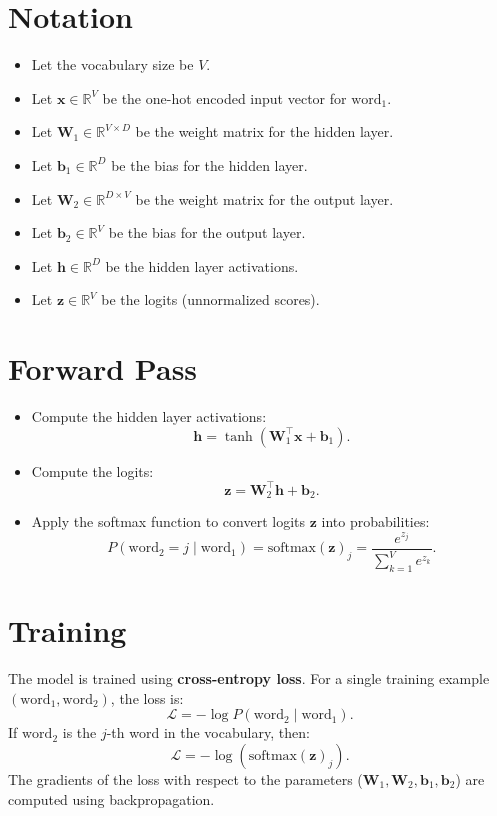 \begin{notechapter}
\section{Notation}
\begin{itemize}
    \item Let the vocabulary size be \( V \).
    \item Let \(\mathbf{x} \in \mathbb{R}^V\) be the one-hot encoded input
          vector for \(\text{word}_1\).
    \item Let \(\mathbf{W}_1 \in \mathbb{R}^{V \times D}\) be the weight matrix
          for the hidden layer.
    \item Let \(\mathbf{b}_1 \in \mathbb{R}^D\) be the bias for the hidden layer.
    \item Let \(\mathbf{W}_2 \in \mathbb{R}^{D \times V}\) be the weight matrix
          for the output layer.
    \item Let \(\mathbf{b}_2 \in \mathbb{R}^V\) be the bias for the output layer.
    \item Let \(\mathbf{h} \in \mathbb{R}^D\) be the hidden layer activations.
    \item Let \(\mathbf{z} \in \mathbb{R}^V\) be the logits (unnormalized scores).
\end{itemize}

\section{Forward Pass}
\begin{itemize}
    \item Compute the hidden layer activations:
          \[
          \mathbf{h} = \tanh(\mathbf{W}_1^\top \mathbf{x} + \mathbf{b}_1).
          \]
    \item Compute the logits:
          \[
          \mathbf{z} = \mathbf{W}_2^\top \mathbf{h} + \mathbf{b}_2.
          \]
    \item Apply the softmax function to convert logits \(\mathbf{z}\) into
          probabilities:
          \[
          P(\text{word}_2 = j \mid \text{word}_1) =
          \text{softmax}(\mathbf{z})_j = \frac{e^{z_j}}{\sum_{k=1}^V e^{z_k}}.
          \]
\end{itemize}

\section{Training}
The model is trained using \textbf{cross-entropy loss}. For a single training
example \((\text{word}_1, \text{word}_2)\), the loss is:
\[
\mathcal{L} = -\log P(\text{word}_2 \mid \text{word}_1).
\]
If \(\text{word}_2\) is the \(j\)-th word in the vocabulary, then:
\[
\mathcal{L} = -\log \left( \text{softmax}(\mathbf{z})_j \right).
\]
The gradients of the loss with respect to the parameters (\(\mathbf{W}_1, \mathbf{W}_2, \mathbf{b}_1, \mathbf{b}_2\)) are computed using backpropagation.


\end{notechapter}

